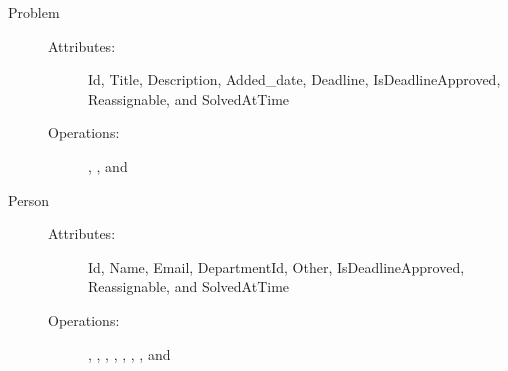 \begin{description}
\item[Problem]\hfill
\begin{description}
	\item[Attributes:]Id, Title, Description, Added\_date, Deadline, IsDeadlineApproved, Reassignable, and SolvedAtTime
	\item[Operations:], , and 
\end{description}
\end{description}

\begin{description}
\item[Person]\hfill
\begin{description}
	\item[Attributes:]Id, Name, Email, DepartmentId, Other, IsDeadlineApproved, Reassignable, and SolvedAtTime
	\item[Operations:], , , , , , , and 
\end{description}
\end{description}


